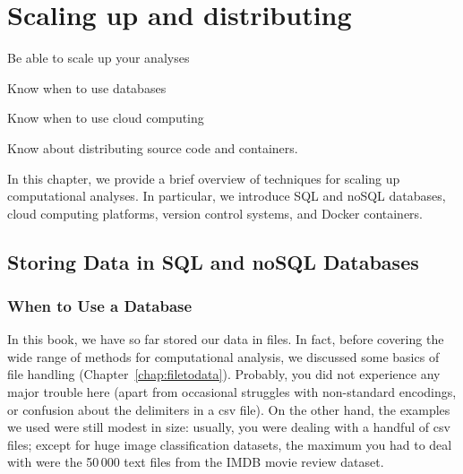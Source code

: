 \chapter{Scaling up and distributing}
\label{chap:scalingup}

\begin{abstract}{Abstract}
  Throughout this book, we have been working with examples that consist of
  code to conduct one specific analysis of data sets of modest size.
  But at some point, you may want to scale up. You may want  others
  to be able to  apply your code to their data; and you may want to be able to also
  use your own analyses on larger and more complex datasets. Or you may
  need to run analyses that your own computer cannot deal with.
  This chapter deals with such  steps and points you to some techniques that become increasingly useful
  the larger your projects get.
\end{abstract}



\begin{objectives}
\item Be able to scale up your analyses
\item Know when to use databases
\item Know when to use cloud computing
\item Know about distributing source code and containers.
\end{objectives}

\begin{feature}
In this chapter, we provide a brief overview of techniques for scaling up computational analyses. In particular, we introduce SQL and noSQL databases, cloud computing platforms, version control systems, and Docker containers.
\end{feature}


%

\section{Storing Data in SQL and noSQL Databases}
\label{sec:databases}

\subsection{When to Use a Database}
In this book, we have so far stored our data in files. In fact, before
covering the wide range of methods for computational analysis, we
discussed some basics of file handling
(Chapter~\ref{chap:filetodata}). Probably, you did not experience any major
trouble here (apart from occasional struggles with non-standard
encodings, or confusion about the delimiters in a csv file). On the
other hand, the examples we used were still modest in size: usually,
you were dealing with a handful of csv files; except for huge image classification datasets, the maximum you had to
deal with were the 50\,000 text files from the IMDB movie review
dataset.

